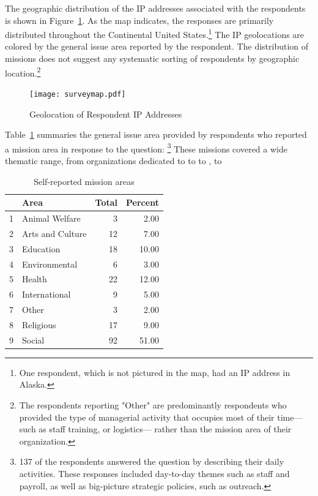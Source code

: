 The geographic distribution of the IP addresses associated with the respondents is shown in Figure~\ref{fig:surveymap}. As the map indicates, the responses are primarily distributed throughout the Continental United States.\footnote{One respondent, which is not pictured in the map, had an IP address in Alaska.} The IP geolocations are colored by the general issue area reported by the respondent. The distribution of missions does not suggest any systematic sorting of respondents by geographic location.\footnote{The respondents reporting "Other" are predominantly respondents who provided the type of managerial activity that occupies most of their time--- such as staff training, or logistics--- rather than the mission area of their organization.}

\begin{figure}[t]
\texttt{[image: surveymap.pdf]}
\centering
\caption{Geolocation of Respondent IP Addresses}
\label{fig:surveymap}
\end{figure}

Table~\ref{tab:missions} summaries the general issue area provided by respondents who reported a mission area in response to the question: \footnote{137 of the respondents answered the question by describing their daily activities. These responses included day-to-day themes such as staff and payroll, as well as big-picture strategic policies, such as outreach.} These missions covered a wide thematic range, from organizations dedicated to  to  to , to 
 \begin{table}[ht]
 \centering
 \begin{tabular}{rlrr}
   \hline
  & Area & Total & Percent \\
   \hline
 1 & Animal Welfare &   3 & 2.00 \\
   2 & Arts and Culture &  12 & 7.00 \\
   3 & Education &  18 & 10.00 \\
   4 & Environmental &   6 & 3.00 \\
   5 & Health &  22 & 12.00 \\
   6 & International &   9 & 5.00 \\
   7 & Other &   3 & 2.00 \\
   8 & Religious &  17 & 9.00 \\
   9 & Social &  92 & 51.00 \\
    \hline
 \end{tabular}
 \caption{Self-reported mission areas}
 \label{tab:missions}
 \end{table}
 
